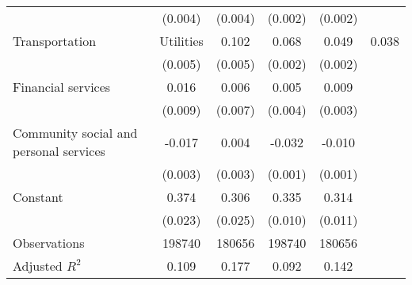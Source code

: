 \begin{table}[htbp]
\begin{tabular}{l*{4}{c}}
                    &     (0.004)         &     (0.004)         &     (0.002)         &     (0.002)         \\
Transportation & Utilities&       0.102\sym{***}&       0.068\sym{***}&       0.049\sym{***}&       0.038\sym{***}\\
                    &     (0.005)         &     (0.005)         &     (0.002)         &     (0.002)         \\
Financial services  &       0.016         &       0.006         &       0.005         &       0.009\sym{**} \\
                    &     (0.009)         &     (0.007)         &     (0.004)         &     (0.003)         \\
Community social and personal services&      -0.017\sym{***}&       0.004         &      -0.032\sym{***}&      -0.010\sym{***}\\
                    &     (0.003)         &     (0.003)         &     (0.001)         &     (0.001)         \\
Constant            &       0.374\sym{***}&       0.306\sym{***}&       0.335\sym{***}&       0.314\sym{***}\\
                    &     (0.023)         &     (0.025)         &     (0.010)         &     (0.011)         \\
\hline
Observations        &      198740         &      180656         &      198740         &      180656         \\
Adjusted \(R^{2}\)  &       0.109         &       0.177         &       0.092         &       0.142         \\
\hline\hline
\end{tabular}
\end{table}
